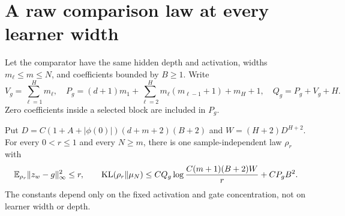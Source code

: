 \section{A raw comparison law at every learner width}
\label{sec:raw-comparison}
Let the comparator have the same hidden depth and activation, widths
$m_\ell\le m\le N$, and coefficients bounded by $B\ge1$. Write
\[
 V_g=\sum_{\ell=1}^Hm_\ell,\quad
 P_g=(d+1)m_1+\sum_{\ell=2}^Hm_\ell(m_{\ell-1}+1)+m_H+1,
 \quad Q_g=P_g+V_g+H.
\]
Zero coefficients inside a selected block are included in $P_g$.

\begin{lemma}
\label{lem:raw-ard-comparison}
Put $D=C(1+A+|\phi(0)|)(d+m+2)(B+2)$ and
$W=(H+2)D^{H+2}$. For every $0<r\le1$ and every $N\ge m$, there is
one sample-independent law $\rho_r$ with
\[
 \mathbb E_{\rho_r}\|z_w-g\|_\infty^2\le r,
 \qquad
 \operatorname{KL}(\rho_r\Vert\mu_N)
 \le C Q_g\log\frac{C(m+1)(B+2)W}{r}+C P_gB^2.
 \label{eq:raw-ard-comparison}
\]
The constants depend only on the fixed activation and gate
concentration, not on learner width or depth.
\end{lemma}
